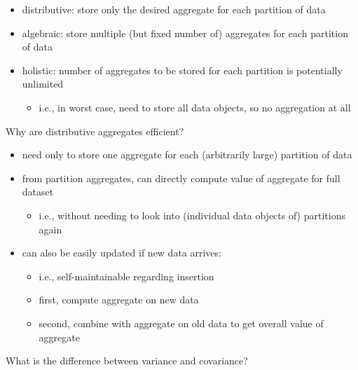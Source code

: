 \documentclass[12pt]{article}
\begin{document}
\begin{itemize}[left=0pt, nosep]
	\item distributive: store only the desired aggregate for each partition of data
	\item algebraic: store multiple (but fixed number of) aggregates for each partition of data
	\item holistic: number of aggregates to be stored for each partition is potentially unlimited
	\begin{itemize}[left=0pt, nosep]
		\item i.e., in worst case, need to store all data objects, so no aggregation at all
	\end{itemize}
\end{itemize}

\begin{question}
	Why are distributive aggregates efficient?
\end{question}

\begin{itemize}[left=0pt, nosep]
	\item need only to store one aggregate for each (arbitrarily large) partition of data
	\item from partition aggregates, can directly compute value of aggregate for full dataset
	\begin{itemize}[left=0pt, nosep]
		\item i.e., without needing to look into (individual data objects of) partitions again
	\end{itemize}
	\item can also be easily updated if new data arrives:
	\begin{itemize}[left=0pt, nosep]
		\item i.e., self-maintainable regarding insertion
		\item first, compute aggregate on new data
		\item second, combine with aggregate on old data to get overall value of aggregate
	\end{itemize}
\end{itemize}

\begin{question}
	What is the difference between variance and covariance?
\end{question}
\end{document}
